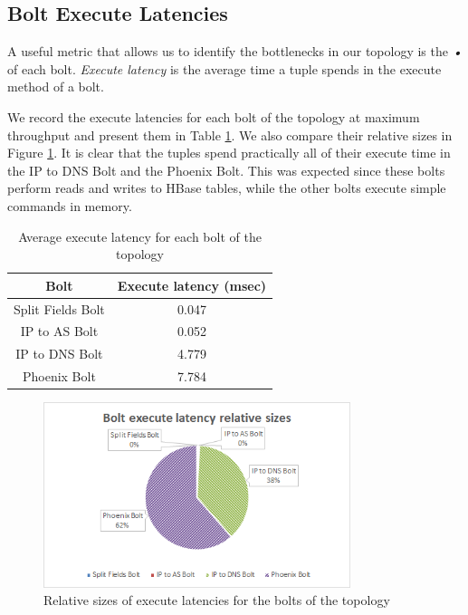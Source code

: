 \subsection{Bolt Execute Latencies}

A useful metric that allows us to identify the bottlenecks in our topology is the \emph{•} of each bolt. \emph{Execute latency} is the average time a tuple spends in the execute method of a bolt. 

We record the execute latencies for each bolt of the topology at maximum throughput and present them in Table \ref{table:execute_latencies}. We also compare their relative sizes in Figure \ref{figure:benchmarks_storm_execute_latencies}. It is clear that the tuples spend practically all of their execute time in the IP to DNS Bolt and the Phoenix Bolt. This was expected since these bolts perform reads and writes to HBase tables, while the other bolts execute simple commands in memory.

\begin{table}[H]
\centering
\begin{tabular}{ |c|c| }
\hline
Bolt & Execute latency (msec) \\ \hline \hline
Split Fields Bolt & 0.047 \\ \hline
IP to AS Bolt & 0.052 \\ \hline
IP to DNS Bolt & 4.779 \\ \hline
Phoenix Bolt & 7.784 \\ \hline
\end{tabular}
\caption{Average execute latency for each bolt of the topology}
\label{table:execute_latencies}
\end{table}

\begin{figure}[H]
\centering
\includegraphics[width=0.8\textwidth]{figures/benchmarks_storm_execute_latencies}
\caption{Relative sizes of execute latencies for the bolts of the topology}
\label{figure:benchmarks_storm_execute_latencies}
\end{figure}

